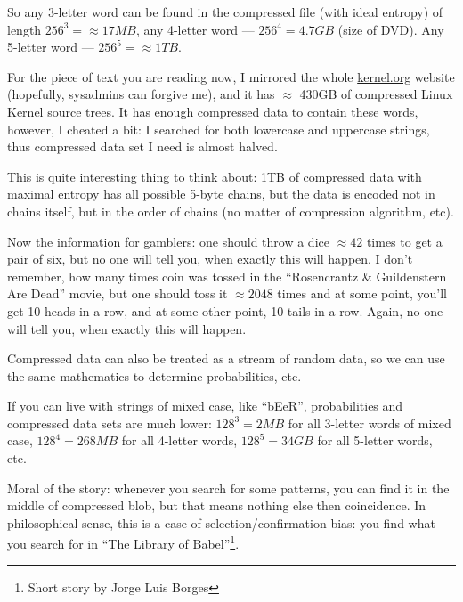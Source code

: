 So any 3-letter word can be found in the compressed file (with ideal entropy) of length $256^3 = \approx 17MB$, any 4-letter word --- $256^4 = 4.7GB$ (size of DVD).
Any 5-letter word --- $256^5 = \approx 1TB$.

For the piece of text you are reading now, I mirrored the whole \href{https://www.kernel.org/}{kernel.org} website (hopefully, sysadmins can forgive me),
and it has $\approx$ 430GB of compressed Linux Kernel source trees.
It has enough compressed data to contain these words, however, I cheated a bit: I searched for both lowercase and uppercase strings, thus compressed data set I need is almost halved.

This is quite interesting thing to think about: 1TB of compressed data with maximal entropy has all possible 5-byte chains,
but the data is encoded not in chains itself, but in the order of chains (no matter of compression algorithm, etc).

Now the information for gamblers: one should throw a dice $\approx 42$ times to get a pair of six, but no one will tell you, when exactly this will happen.
I don't remember, how many times coin was tossed in the ``Rosencrantz \& Guildenstern Are Dead'' movie, but one should toss it $\approx 2048$ times and at some point, you'll get 10 heads in a row,
and at some other point, 10 tails in a row. Again, no one will tell you, when exactly this will happen.

Compressed data can also be treated as a stream of random data, so we can use the same mathematics to determine probabilities, etc.

If you can live with strings of mixed case, like ``bEeR'', probabilities and compressed data sets are much lower:
$128^3=2MB$ for all 3-letter words of mixed case,
$128^4=268MB$ for all 4-letter words,
$128^5=34GB$ for all 5-letter words, etc.

Moral of the story: whenever you search for some patterns, you can find it in the middle of compressed blob, but that means nothing else then coincidence.
In philosophical sense, this is a case of selection/confirmation bias: you find what you search for in ``The Library of Babel''\footnote{Short story by Jorge Luis Borges}.

